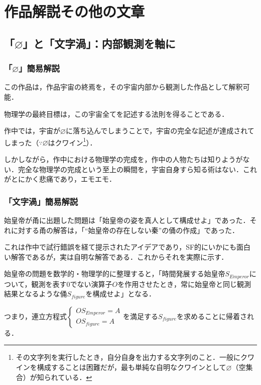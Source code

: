 \documentclass[10pt, a5paper, twoside]{jsarticle}
\begin{document}
	\section{作品解説その他の文章}

		\subsection{「$\varnothing$」と「文字渦」：内部観測を軸に}
			
			\subsubsection{「$\varnothing$」簡易解説}

				この作品は，作品宇宙の終焉を，その宇宙内部から観測した作品として解釈可能．

				物理学の最終目標は，この宇宙全てを記述する法則を得ることである\cite{Hawking}．

				作中では，宇宙が$ \varnothing$に落ち込んでしまうことで，宇宙の完全な記述が達成されてしまった（$ \because \varnothing$はクワイン\footnote{その文字列を実行したとき，自分自身を出力する文字列のこと．一般にクワインを構成することは困難だが，最も単純な自明なクワインとして$ \varnothing $（空集合）が知られている．}）．

				しかしながら，作中における物理学の完成を，作中の人物たちは知りようがない．完全な物理学の完成という至上の瞬間を，宇宙自身すら知る術はない．これがとにかく悲痛であり，エモエモ．

			\subsubsection{「文字渦」簡易解説}

				始皇帝が甬に出題した問題は「始皇帝の姿を真人として構成せよ」であった．それに対する甬の解答は，「“始皇帝の存在しない秦”の俑の作成」であった．

				これは作中で試行錯誤を経て提示されたアイデアであり，SF的にいかにも面白い解答であるが，実は自明な解答である．これからそれを実際に示す．

				始皇帝の問題を数学的・物理学的に整理すると，「時間発展する始皇帝$ S_{Emperor} $について，観測を表す0でない演算子$ O $を作用させたとき，常に始皇帝と同じ観測結果となるような俑$ S_{figure} $を構成せよ」となる．

				つまり，連立方程式$ \begin{cases} O S_{Emperor} = A \\ O S_{figure} = A \end{cases} $を満足する$ S_{figure} $を求めることに帰着される．
\end{document}
